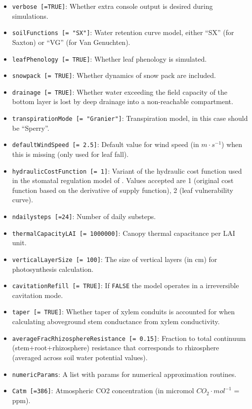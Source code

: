 \documentclass[]{book}
\providecommand{\tightlist}{%
  \setlength{\itemsep}{0pt}\setlength{\parskip}{0pt}}
\begin{document}
\begin{itemize}
\tightlist
\item
  \texttt{verbose\ {[}=TRUE{]}}: Whether extra console output is desired
  during simulations.
\item
  \texttt{soilFunctions\ {[}=\ "SX"{]}}: Water retention curve model,
  either ``SX'' (for Saxton) or ``VG'' (for Van Genuchten).
\item
  \texttt{leafPhenology\ {[}=\ TRUE{]}}: Whether leaf phenology is
  simulated.
\item
  \texttt{snowpack\ {[}=\ TRUE{]}}: Whether dynamics of snow pack are
  included.
\item
  \texttt{drainage\ {[}=\ TRUE{]}}: Whether water exceeding the field
  capacity of the bottom layer is lost by deep drainage into a
  non-reachable compartment.
\item
  \texttt{transpirationMode\ {[}=\ "Granier"{]}}: Transpiration model,
  in this case should be ``Sperry''.
\item
  \texttt{defaultWindSpeed\ {[}=\ 2.5{]}}: Default value for wind speed
  (in \(m \cdot s^{-1}\)) when this is missing (only used for leaf
  fall).
\item
  \texttt{hydraulicCostFunction\ {[}=\ 1{]}}: Variant of the hydraulic
  cost function used in the stomatal regulation model of
  \citet{Sperry2016}. Values accepted are 1 (original cost function
  based on the derivative of supply function), 2 (leaf vulnerability
  curve).
\item
  \texttt{ndailysteps\ {[}=24{]}}: Number of daily substeps.
\item
  \texttt{thermalCapacityLAI\ {[}=\ 1000000{]}}: Canopy thermal
  capacitance per LAI unit.
\item
  \texttt{verticalLayerSize\ {[}=\ 100{]}}: The size of vertical layers
  (in cm) for photosynthesis calculation.
\item
  \texttt{cavitationRefill\ {[}=\ TRUE{]}}: If \texttt{FALSE} the model
  operates in a irreversible cavitation mode.
\item
  \texttt{taper\ {[}=\ TRUE{]}}: Whether taper of xylem conduits is
  accounted for when calculating aboveground stem conductance from xylem
  conductivity.
\item
  \texttt{averageFracRhizosphereResistance\ {[}=\ 0.15{]}}: Fraction to
  total continuum (stem+root+rhizosphere) resistance that corresponds to
  rhizosphere (averaged across soil water potential values).
\item
  \texttt{numericParams}: A list with params for numerical approximation
  routines.
\item
  \texttt{Catm\ {[}=386{]}}: Atmospheric CO2 concentration (in micromol
  \(CO_2 \cdot mol^{-1}\) = ppm).
\end{itemize}
\end{document}
